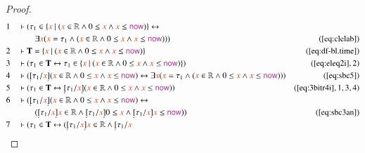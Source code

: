 \begin{proof}
\begin{align}
  1 &&  & \vdash ( \tau_1 \in \{ \msc{x}~\vert~( \msc{x} \in \mathbb{R} \wedge 0
      \le \msc{x} \wedge \msc{x} \le \mathsf{\mc{now}} ) \}
      \leftrightarrow  \notag \\ & & & \qquad
      \exists \msc{x} ( \msc{x} = \tau_1
      \wedge ( \msc{x} \in \mathbb{R} \wedge 0 \le \msc{x}
      \wedge \msc{x} \le \mathsf{\mc{now}} ) )
      )&(\mbox{\ref{eq:clelab}})\notag
  \\ 2 &&  & \vdash \mathbf{T} = \{ \msc{x}~\vert~( \msc{x} \in \mathbb{R} \wedge 0
      \le \msc{x} \wedge \msc{x} \le \mathsf{\mc{now}} )
      \}&(\mbox{\ref{eq:df-bl.time}})\notag
  \\ 3 &&  & \vdash ( \tau_1 \in \mathbf{T} \leftrightarrow \tau_1 \in \{
      \msc{x}~\vert~( \msc{x} \in \mathbb{R} \wedge 0 \le
      \msc{x} \wedge \msc{x} \le \mathsf{\mc{now}} ) \}
      )&(\mbox{\ref{eq:eleq2i}},2)\notag
  \\ 4 &&  & \vdash ( \underaccent{\dot}{[} \tau_1 / \msc{x}
      \underaccent{\dot}{]} ( \msc{x} \in \mathbb{R} \wedge
      0 \le \msc{x} \wedge \msc{x} \le \mathsf{\mc{now}} )
      \leftrightarrow \exists \msc{x} ( \msc{x} = \tau_1
      \wedge ( \msc{x} \in \mathbb{R} \wedge 0 \le \msc{x}
      \wedge \msc{x} \le \mathsf{\mc{now}} ) )
      )&(\mbox{\ref{eq:sbc5}})\notag
  \\ 5 &&  & \vdash ( \tau_1 \in \mathbf{T} \leftrightarrow
      \underaccent{\dot}{[} \tau_1 / \msc{x}
      \underaccent{\dot}{]} ( \msc{x} \in \mathbb{R} \wedge
      0 \le \msc{x} \wedge \msc{x} \le \mathsf{\mc{now}} )
      )&(\mbox{\ref{eq:3bitr4i}},1,3,4)\notag
  \\ 6 &&  & \vdash ( \underaccent{\dot}{[} \tau_1 / \msc{x}
      \underaccent{\dot}{]} ( \msc{x} \in \mathbb{R} \wedge
      0 \le \msc{x} \wedge \msc{x} \le \mathsf{\mc{now}} )
      \leftrightarrow \notag \\ & & & \qquad
       ( \underaccent{\dot}{[} \tau_1 /
      \msc{x} \underaccent{\dot}{]} \msc{x} \in \mathbb{R}
      \wedge \underaccent{\dot}{[} \tau_1 / \msc{x}
      \underaccent{\dot}{]} 0 \le \msc{x} \wedge
      \underaccent{\dot}{[} \tau_1 / \msc{x}
      \underaccent{\dot}{]} \msc{x} \le \mathsf{\mc{now}} )
      )&(\mbox{\ref{eq:sbc3an}})\notag
  \\ 7 &&  & \vdash ( \tau_1 \in \mathbf{T} \leftrightarrow (
      \underaccent{\dot}{[} \tau_1 / \msc{x}
      \underaccent{\dot}{]} \msc{x} \in \mathbb{R} \wedge
      \underaccent{\dot}{[} \tau_1 / \msc{x}

\end{align}
\end{proof}
